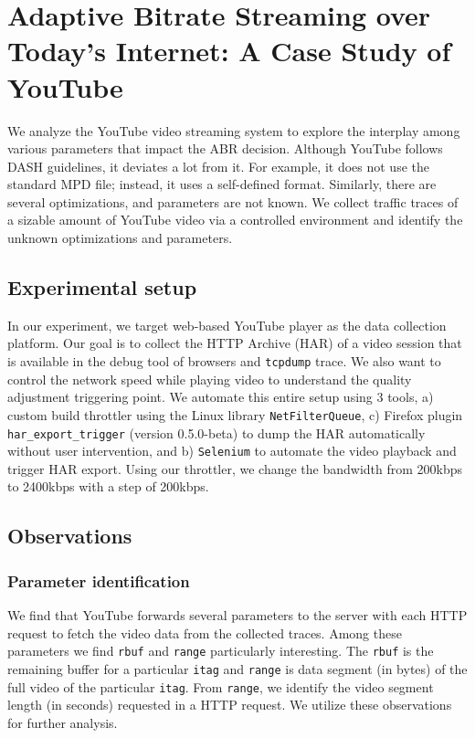 \section{Adaptive Bitrate Streaming over Today’s Internet: A Case Study of YouTube}
We analyze the YouTube video streaming system to explore the interplay among various parameters that impact the ABR decision. Although YouTube follows DASH guidelines, it deviates a lot from it. For example, it does not use the standard MPD file; instead, it uses a self-defined format. Similarly, there are several optimizations, and parameters are not known. We collect traffic traces of a sizable amount of YouTube video via a controlled environment and identify the unknown optimizations and parameters.
\subsection{Experimental setup}
In our experiment, we target web-based YouTube player as the data collection platform. Our goal is to collect the HTTP Archive (HAR) of a video session that is available in the debug tool of browsers and {\tt tcpdump} trace. We also want to control the network speed while playing video to understand the quality adjustment triggering point. We automate this entire setup using 3 tools, a) custom build throttler using the Linux library {\tt NetFilterQueue}, c) Firefox plugin {\tt har\_export\_trigger} (version 0.5.0-beta) to dump the HAR automatically without user intervention, and b) {\tt Selenium} to automate the video playback and trigger HAR export. Using our throttler, we change the bandwidth from 200kbps to 2400kbps with a step of 200kbps.
\subsection{Observations}
\subsubsection{Parameter identification}
We find that YouTube forwards several parameters to the server with each HTTP request to fetch the video data from the collected traces. Among these parameters we find {\tt rbuf} and {\tt range} particularly interesting. The {\tt rbuf} is the remaining buffer for a particular {\tt itag} and {\tt range} is data segment (in bytes) of the full video of the particular {\tt itag}. From {\tt range},  we identify the video segment length (in seconds) requested in a HTTP request. We utilize these observations for further analysis.
